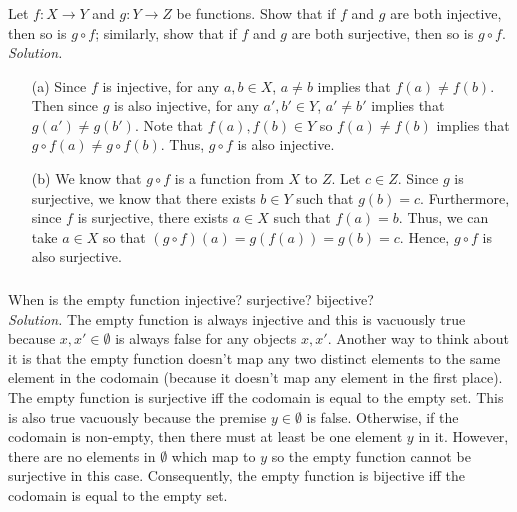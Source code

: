 \documentclass{amsart}
\theoremstyle{definition}
\newcommand{\soln}{\newline\textit{Solution.} }
\begin{document}
\subsubsection{} Let $f:X\to Y$ and $g:Y\to Z$ be functions. Show that if $f$ and $g$ are both injective, then so is $g\circ f$; similarly, show that if $f$ and $g$ are both surjective, then so is $g\circ f$. \\
\soln 
\begin{enumerate}
\item[(a)] Since $f$ is injective, for any $a,b\in X$, $a\neq b$ implies that $f(a)\neq f(b)$. Then since $g$ is also injective, for any $a',b'\in Y$, $a'\neq b'$ implies that $g(a')\neq g(b')$. Note that $f(a),f(b)\in Y$ so $f(a)\neq f(b)$ implies that $g\circ f(a) \neq g\circ f(b)$. Thus, $g\circ f$ is also injective. \\
\item[(b)] We know that $g\circ f$ is a function from $X$ to $Z$. Let $c\in Z$. Since $g$ is surjective, we know that there exists $b\in Y$ such that $g(b)=c$. Furthermore, since $f$ is surjective, there exists $a\in X$ such that $f(a)=b$. Thus, we can take $a\in X$ so that $(g\circ f)(a)=g(f(a))=g(b)=c$. Hence, $g\circ f$ is also surjective. \\
\end{enumerate}


\subsubsection{} When is the empty function injective? surjective? bijective? \\
\soln The empty function is always injective and this is vacuously true because $x,x'\in \emptyset$ is always false for any objects $x,x'$. Another way to think about it is that the empty function doesn't map any two distinct elements to the same element in the codomain (because it doesn't map any element in the first place). The empty function is surjective iff the codomain is equal to the empty set. This is also true vacuously because the premise $y\in\emptyset$ is false. Otherwise, if the codomain is non-empty, then there must at least be one element $y$ in it. However, there are no elements in $\emptyset$ which map to $y$ so the empty function cannot be surjective in this case. Consequently, the empty function is bijective iff the codomain is equal to the empty set. \\
\end{document}
